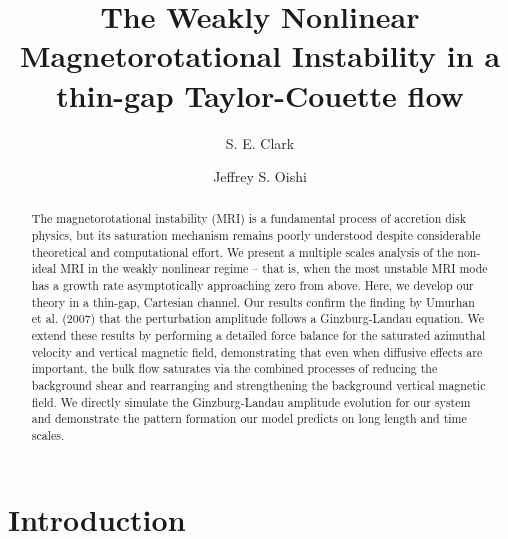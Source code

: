 \documentclass{emulateapj}
\begin{document}
\title{The Weakly Nonlinear Magnetorotational Instability in a thin-gap Taylor-Couette flow}
\author{S. E. Clark}
\author{Jeffrey S. Oishi}



\begin{abstract}
The magnetorotational instability (MRI) is a fundamental process of accretion disk physics, but its saturation mechanism remains poorly understood despite considerable theoretical and computational effort. We present a multiple scales analysis of the non-ideal MRI in the weakly nonlinear regime -- that is, when the most unstable MRI mode has a growth rate asymptotically approaching zero from above. Here, we develop our theory in a thin-gap, Cartesian channel. Our results confirm the finding by Umurhan et al. (2007) that the perturbation amplitude follows a Ginzburg-Landau equation. We extend these results by performing a detailed force balance for the saturated azimuthal velocity and vertical magnetic field, demonstrating that even when diffusive effects are important, the bulk flow saturates via the combined processes of reducing the background shear and rearranging and strengthening the background vertical magnetic field. We directly simulate the Ginzburg-Landau amplitude evolution for our system and demonstrate the pattern formation our model predicts on long length and time scales. 
\end{abstract}

\section{Introduction}
\end{document}

